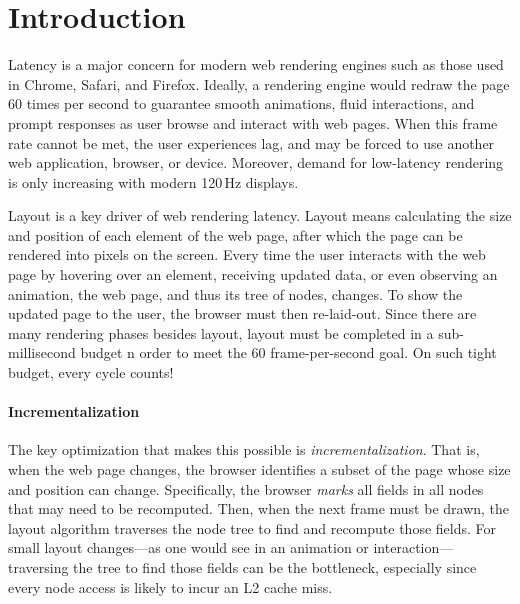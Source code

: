 
\section{Introduction}

Latency is a major concern for modern web rendering engines
  such as those used in Chrome, Safari, and Firefox.
Ideally, a rendering engine
  would redraw the page 60 times per second
  to guarantee smooth animations, fluid interactions,
  and prompt responses as user browse and interact with web pages.
When this frame rate cannot be met,
  the user experiences lag, and may be forced to use another web application, browser, or device.
Moreover, demand for low-latency rendering is only increasing
  with modern 120\,Hz displays.

Layout is a key driver of web rendering latency.
Layout means calculating the size and position
  of each element of the web page,
  after which the page can be rendered into pixels on the screen.
Every time the user interacts with the web page
  by hovering over an element,
  receiving updated data,
  or even observing an animation,
  the web page, and thus its tree of nodes, changes.
To show the updated page to the user,
  the browser must then re-laid-out.
Since there are many rendering phases besides layout,
  layout must be completed in a sub-millisecond budget 
  n order to meet the 60 frame-per-second goal.
On such tight budget, every cycle counts!

\paragraph{Incrementalization}
The key optimization that makes this possible is \emph{incrementalization}. That is, when the web page changes, the browser identifies a subset of the page whose size and position can change. Specifically, the browser \emph{marks} all fields in all nodes that may need to be recomputed. Then, when the next frame must be drawn, the layout algorithm traverses the node tree to find and recompute those fields. For small layout changes---as one would see in an animation or interaction---traversing the tree to find those fields can be the bottleneck, especially since every node access is likely to incur an L2 cache miss.

